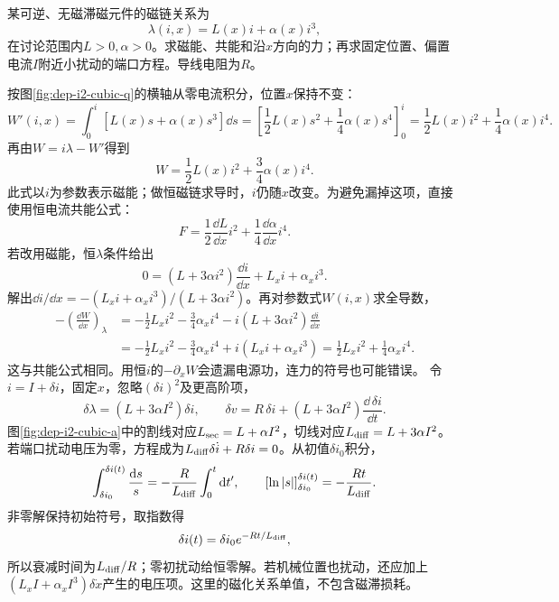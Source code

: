 \begin{example}[位置相关非线性电感的力和小信号响应]
某可逆、无磁滞磁元件的磁链关系为
\[
 \lambda(i,x)=L(x)i+\alpha(x)i^3,
\]
在讨论范围内$L>0,\alpha>0$。求磁能、共能和沿$x$方向的力；再求固定位置、偏置电流$I$附近小扰动的端口方程。导线电阻为$R$。
\end{example}
\begin{solution}
按图\ref{fig:dep-i2-cubic-q}的横轴从零电流积分，位置$x$保持不变：
\[
 W'(i,x)=\int_0^i[L(x)s+\alpha(x)s^3]\dd s
 =\left[\frac12L(x)s^2+\frac14\alpha(x)s^4\right]_0^i
 =\frac12L(x)i^2+\frac14\alpha(x)i^4.
\]
再由$W=i\lambda-W'$得到
\[
 W=\frac12L(x)i^2+\frac34\alpha(x)i^4.
\]
此式以$i$为参数表示磁能；做恒磁链求导时，$i$仍随$x$改变。为避免漏掉这项，直接使用恒电流共能公式：
\[
 \boxed{F=\frac12\frac{\dd L}{\dd x}i^2+
 \frac14\frac{\dd\alpha}{\dd x}i^4.}
\]
若改用磁能，恒$\lambda$条件给出
\[
 0=(L+3\alpha i^2)\frac{\dd i}{\dd x}
 +L_xi+\alpha_xi^3.
\]
解出$\dd i/\dd x=-(L_xi+\alpha_xi^3)/(L+3\alpha i^2)$。再对参数式$W(i,x)$求全导数，
\[\begin{aligned}
-\left(\frac{\dd W}{\dd x}\right)_\lambda
&=-\frac12L_xi^2-\frac34\alpha_xi^4
-i(L+3\alpha i^2)\frac{\dd i}{\dd x}\\
&=-\frac12L_xi^2-\frac34\alpha_xi^4
+i(L_xi+\alpha_xi^3)
=\frac12L_xi^2+\frac14\alpha_xi^4.
\end{aligned}\]
这与共能公式相同。用恒$i$的$-\partial_xW$会遗漏电源功，连力的符号也可能错误。
令$i=I+\delta i$，固定$x$，忽略$(\delta i)^2$及更高阶项，
\[
 \delta\lambda=(L+3\alpha I^2)\delta i,\qquad
 \boxed{\delta v=R\,\delta i+
 (L+3\alpha I^2)\frac{\dd\,\delta i}{\dd t}.}
\]
图\ref{fig:dep-i2-cubic-a}中的割线对应$L_{\rm sec}=L+\alpha I^2$，切线对应$L_{\rm diff}=L+3\alpha I^2$。若端口扰动电压为零，方程成为$L_{\rm diff}\delta\dot i+R\delta i=0$。从初值$\delta i_0$积分，
\[\int_{\delta i_0}^{\delta i(t)}\frac{\mathop{}\!\mathrm d s}s=-\frac{R}{L_{\rm diff}}\int_0^t\mathop{}\!\mathrm d t',\qquad
[\ln|s|]_{\delta i_0}^{\delta i(t)}=-\frac{Rt}{L_{\rm diff}}.\]
非零解保持初始符号，取指数得
\[\delta i(t)=\delta i_0e^{-Rt/L_{\rm diff}},\]
所以衰减时间为$L_{\rm diff}/R$；零初扰动给恒零解。若机械位置也扰动，还应加上$(L_xI+\alpha_xI^3)\delta\dot x$产生的电压项。这里的磁化关系单值，不包含磁滞损耗。
\end{solution}

